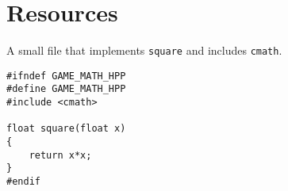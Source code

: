 \section{Resources}

A small file that implements \texttt{square} and includes \texttt{cmath}.

\begin{lstlisting}
#ifndef GAME_MATH_HPP
#define GAME_MATH_HPP
#include <cmath>

float square(float x)
{
    return x*x;
}
#endif
\end{lstlisting}
